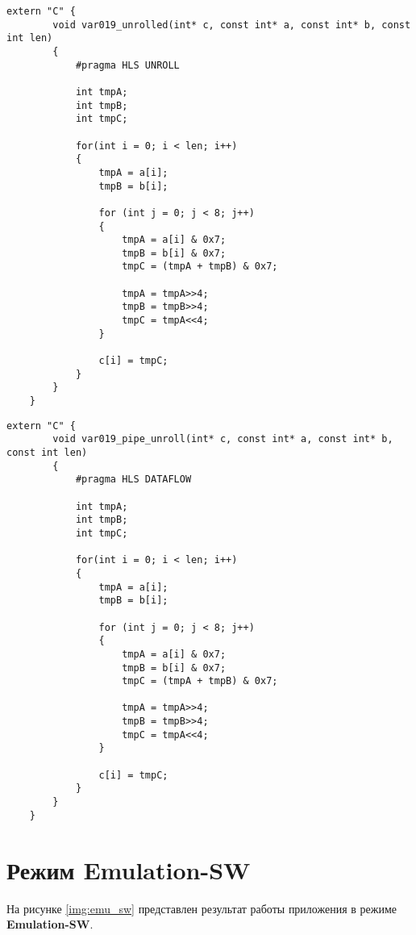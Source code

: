 \begin{center}
    \captionsetup{justification=raggedright,singlelinecheck=off}
    \begin{lstlisting}[label=lst:var19_unrolled,caption=Код программы (частично развернутый цикл)]
	extern "C" {
		void var019_unrolled(int* c, const int* a, const int* b, const int len) 
		{
			#pragma HLS UNROLL
	
			int tmpA;
			int tmpB;
			int tmpC;
	
			for(int i = 0; i < len; i++)
			{
				tmpA = a[i];
				tmpB = b[i];
	
				for (int j = 0; j < 8; j++)
				{
					tmpA = a[i] & 0x7;
					tmpB = b[i] & 0x7;
					tmpC = (tmpA + tmpB) & 0x7;
					
					tmpA = tmpA>>4;
					tmpB = tmpB>>4;
					tmpC = tmpA<<4;
				}
	
				c[i] = tmpC;
			}
		}
	}
\end{lstlisting}
\end{center}


\begin{center}
    \captionsetup{justification=raggedright,singlelinecheck=off}
    \begin{lstlisting}[label=lst:var19_unroll,caption=Код программы (конвейрный с частично развернутым циклом)]
	extern "C" {
		void var019_pipe_unroll(int* c, const int* a, const int* b, const int len) 
		{
			#pragma HLS DATAFLOW
	
			int tmpA;
			int tmpB;
			int tmpC;
	
			for(int i = 0; i < len; i++)
			{
				tmpA = a[i];
				tmpB = b[i];
	
				for (int j = 0; j < 8; j++)
				{
					tmpA = a[i] & 0x7;
					tmpB = b[i] & 0x7;
					tmpC = (tmpA + tmpB) & 0x7;
					
					tmpA = tmpA>>4;
					tmpB = tmpB>>4;
					tmpC = tmpA<<4;
				}
	
				c[i] = tmpC;
			}
		}
	}
\end{lstlisting}
\end{center}

\clearpage


\section{Режим Emulation-SW}

На рисунке \ref{img:emu_sw} представлен результат работы приложения в режиме \textbf{Emulation-SW}.




